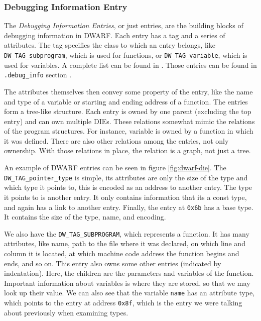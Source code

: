 \subsubsection{Debugging Information Entry}
The \textit{Debugging Information Entries}, or just entries, are the building
blocks of debugging information in DWARF. Each entry has a tag and a series of
attributes. The tag specifies the class to which an entry belongs, like
\texttt{DW\_TAG\_subprogram}, which is used for functions, or
\texttt{DW\_TAG\_variable}, which is used for variables. A complete list can be
found in \cite{dwarf}. Those entries can be found in \texttt{.debug\_info}
section \cite{dwarf}. 

The attributes themselves then convey some property of the entry, like the name
and type of a variable or starting and ending address of a function. The entries
form a tree-like structure. Each entry is owned by one parent (excluding the top
entry) and can own multiple DIEs. These relations somewhat mimic the relations of
the program structures. For instance, variable is owned by a function in which
it was defined. There are also other relations among the entries, not only
ownership. With those relations in place, the relation is a graph, not just a
tree.

An example of DWARF entries can be seen in figure \ref{fig:dwarf-die}. The
\texttt{DW\_TAG\_pointer\_type} is simple, its attributes are only the size of
the type and which type it points to, this is encoded as an address to another
entry. The type it points to is another entry. It only contains information that
its a const type, and again has a link to another entry. Finally, the entry at
\texttt{0x6b} has a base type. It contains the size of the type, name, and
encoding. 

We also have the \texttt{DW\_TAG\_SUBPROGRAM}, which represents a function. It
has many attributes, like name, path to the file where it was declared, on
which line and column it is located, at which machine code address the function
begins and ends, and so on. This entry also owns some other entries (indicated
by indentation). Here, the children are the parameters and variables of the
function. Important information about variables is where they are stored, so
that we may look up their value. We can also see that the variable
\texttt{name} has an attribute type, which points to the entry at address
\texttt{0x8f}, which is the entry we were talking about previously when
examining types.

